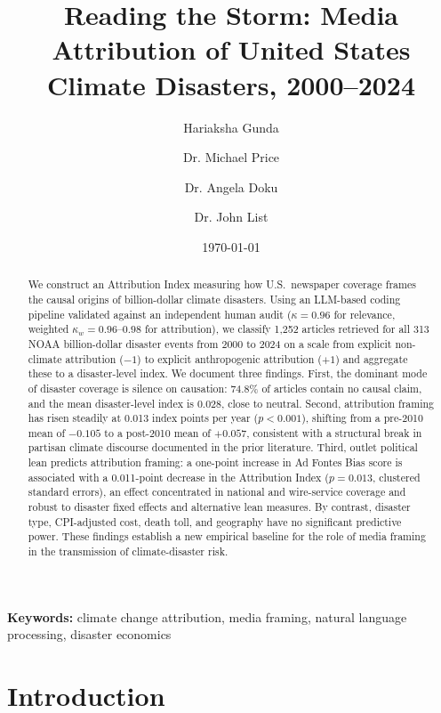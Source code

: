 \documentclass[12pt]{article}
\title{Reading the Storm: Media Attribution of United States Climate Disasters, 2000--2024}
\author[1]{Hariaksha Gunda}
\author[2]{Dr. Michael Price}
\author[3]{Dr. Angela Doku}
\author[4]{Dr. John List}
\affil[1]{University of Alabama}
\affil[2]{University of Alabama}
\affil[3]{University of Toronto}
\affil[4]{University of Chicago}
\date{\today}
\begin{document}
\maketitle

\begin{abstract}
\begin{sloppypar}
We construct an Attribution Index measuring how U.S.\ newspaper
coverage frames the causal origins of billion-dollar climate disasters.
Using an LLM-based coding pipeline validated against an independent
human audit ($\kappa = 0.96$ for relevance, weighted
$\kappa_w = 0.96$--$0.98$ for attribution), we classify 1,252
articles retrieved for all 313 NOAA billion-dollar disaster events
from 2000 to 2024 on a scale from explicit non-climate attribution
($-1$) to explicit anthropogenic attribution ($+1$) and aggregate these
to a disaster-level index.  We document three findings.  First, the
dominant mode of disaster coverage is silence on causation: 74.8\% of
articles contain no causal claim, and the mean disaster-level index is
0.028, close to neutral.  Second, attribution framing has risen
steadily at 0.013 index points per year ($p < 0.001$), shifting from a
pre-2010 mean of $-0.105$ to a post-2010 mean of $+0.057$, consistent
with a structural break in partisan climate discourse documented in the
prior literature.  Third, outlet political lean predicts attribution
framing: a one-point increase in Ad Fontes Bias score is associated
with a 0.011-point decrease in the Attribution Index ($p = 0.013$,
clustered standard errors), an effect concentrated in national and
wire-service coverage and robust to disaster fixed effects and
alternative lean measures.  By contrast, disaster type, CPI-adjusted
cost, death toll, and geography have no significant predictive power.
These findings establish a new empirical baseline for the role of
media framing in the transmission of climate-disaster risk.
\end{sloppypar}
\end{abstract}

\noindent \textbf{Keywords:} climate change attribution, media framing,
natural language processing, disaster economics

\newpage


\section{Introduction}
\end{document}
